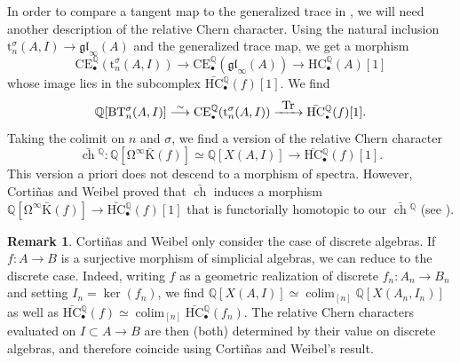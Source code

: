 \documentclass[JEP,XML,SOM,Unicode,NoEqCountersInSection]{cedram}
\let\autoref\Cref
\newcommand{\To}[1]{\mathchoice{\xrightarrow{\textstyle\kern4pt#1\kern3pt}}{\stackrel{#1}{\longrightarrow}}{}{}}
\newcommand{\isom}{\stackrel{\sim}{\longrightarrow}}
\let\widebar\bar
\newcommand{\sbullet}{{\scriptscriptstyle\bullet}}
\theoremstyle{definition}
\newtheorem{rmq}[thm]{Remark}
\newcommand{\Q}{\mathbb{Q}}
\DeclareMathOperator{\colim}{colim}
\newcommand{\B}{\mathrm{B}}
\newcommand{\gl}{\mathfrak{gl}}
\newcommand{\bch}{\widebar{\operatorname{ch}}}
\newcommand{\bK}{\widebar{\mathrm{K}}}
\newcommand{\HC}{\mathrm{HC}}
\newcommand{\bHC}{\widebar{\mathrm{HC}}{}}
\newcommand{\infloop}{\operatorname{\Omega^\infty}}
\newcommand{\CE}{\mathrm{CE}}
\newcommand{\Tr}{\operatorname{Tr}}
\begin{document}
In order to compare a tangent map to the generalized trace in \autoref{sec:tracemap}, we will need another description of the relative Chern character.
Using the natural inclusion $\mathrm{t}^\sigma_n(A,I) \to \gl_\infty(A)$ and the generalized trace map, we get a morphism
\[
\CE_\sbullet^\Q(\mathrm{t}^\sigma_n(A,I)) \to \CE_\sbullet^\Q(\gl_\infty(A)) \to \HC_\sbullet^\Q(A)[1]
\]
whose image lies in the subcomplex $\bHC_\sbullet^\Q(f)[1]$. We find
\[
\Q[\B \mathrm{T}^\sigma_n(A,I)] \isom \CE_\sbullet^\Q(\mathrm{t}^\sigma_n(A,I)) \To\Tr \bHC_\sbullet^\Q(f)[1].
\]
Taking the colimit on $n$ and $\sigma$, we find a version of the relative Chern character
\[
\bch{}^\Q \colon \Q[\infloop \bK(f)] \simeq \Q[X(A,I)] \to \bHC_\sbullet^\Q(f)[1].
\]
This version a priori does not descend to a morphism of spectra. However, Cortiñas and Weibel proved that $\bch$ induces a morphism $\Q[\infloop \bK(f)] \to \bHC_\sbullet^\Q(f)[1]$ that is functorially homotopic to our $\bch{}^\Q$ (see \cite{cortinasweibel:relative}).
\begin{rmq}\label{rmq:relChern}
Cortiñas and Weibel only consider the case of discrete algebras. If $f \colon A \to B$ is a surjective morphism of simplicial algebras, we can reduce to the discrete case. Indeed, writing $f$ as a geometric realization of discrete $f_n \colon A_n \to B_n$ and setting $I_n = \ker(f_n)$, we find $\Q[X(A,I)] \simeq \colim_{[n]} \Q[X(A_n,I_n)]$ as well as $\bHC_\sbullet^\Q(f) \simeq \colim_{[n]} \bHC_\sbullet^\Q(f_n)$.
The relative Chern characters evaluated on $I \subset A \to B$ are then (both) determined by their value on discrete algebras, and therefore coincide using Cortiñas and Weibel's result.
\end{rmq}
\end{document}
